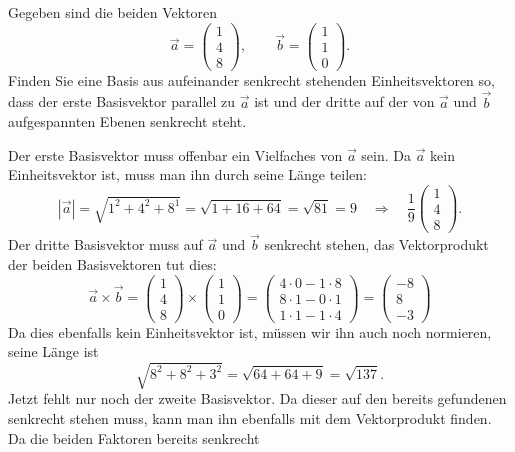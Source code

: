 Gegeben sind die beiden Vektoren
\[
\vec a
=
\begin{pmatrix}
1\\4\\8
\end{pmatrix}
,\qquad
\vec b
=
\begin{pmatrix}
1\\1\\0
\end{pmatrix}.
\]
Finden Sie eine Basis aus aufeinander senkrecht stehenden
Einheitsvektoren so, dass der erste Basisvektor parallel zu
$\vec a$ ist und der dritte auf der von $\vec a$ und $\vec b$
aufgespannten Ebenen senkrecht steht.


\begin{loesung}
Der erste Basisvektor muss offenbar ein Vielfaches von $\vec a$ sein.
Da $\vec a$ kein Einheitsvektor ist, muss man ihn durch seine Länge
teilen:
\[
|\vec a|=\sqrt{1^2+4^2+8^1}=\sqrt{1+16+64}=\sqrt{81}=9
\quad
\Rightarrow
\quad
\frac19
\begin{pmatrix}
1\\4\\8
\end{pmatrix}.
\]
Der dritte Basisvektor muss auf $\vec a$ und $\vec b$ senkrecht stehen,
das Vektorprodukt der beiden Basisvektoren tut dies:
\[
\vec a\times\vec b=
\begin{pmatrix}
1\\4\\8
\end{pmatrix}
\times
\begin{pmatrix}
1\\1\\0
\end{pmatrix}
=
\begin{pmatrix}
4\cdot 0-1\cdot 8\\
8\cdot 1-0\cdot 1\\
1\cdot 1-1\cdot 4
\end{pmatrix}
=
\begin{pmatrix}
-8\\
8\\
-3
\end{pmatrix}
\]
Da dies ebenfalls kein Einheitsvektor ist, müssen wir ihn auch noch
normieren, seine Länge ist
\[
\sqrt{8^2+8^2+ 3^2}=\sqrt{64+64+9}=\sqrt{137}.
\]
Jetzt fehlt nur noch der zweite Basisvektor.
Da dieser auf den bereits
gefundenen senkrecht stehen muss, kann man ihn ebenfalls mit 
dem Vektorprodukt finden. Da die beiden Faktoren bereits senkrecht

\end{loesung}
